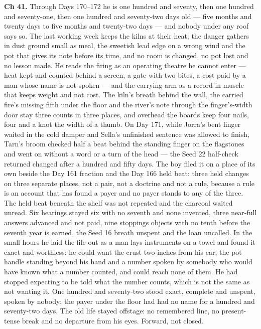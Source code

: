 \documentclass{design/chronicle}
\begin{document}
{\textbf{Ch 41.} Through Days 170–172 he is one hundred and seventy, then one hundred and seventy-one, then one hundred and seventy-two days old — five months and twenty days to five months and twenty-two days — and nobody under any roof says so. The last working week keeps the kilns at their heat; the danger gathers in dust ground small as meal, the sweetish lead edge on a wrong wind and the pot that gives its note before its time, and no room is changed, no pot lost and no lesson made. He reads the firing as an operating theatre he cannot enter — heat kept and counted behind a screen, a gate with two bites, a cost paid by a man whose name is not spoken — and the carrying arm as a record in muscle that keeps weight and not cost. The kiln’s breath behind the wall, the carried fire’s missing fifth under the floor and the river’s note through the finger’s-width door stay three counts in three places, and overhead the boards keep four nails, four and a knot the width of a thumb. On Day 171, while Jorra’s bent finger waited in the cold damper and Sella’s unfinished sentence was allowed to finish, Tarn’s broom checked half a beat behind the standing finger on the flagstones and went on without a word or a turn of the head — the Seed 22 half-check returned changed after a hundred and fifty days. The boy filed it on a place of its own beside the Day 161 fraction and the Day 166 held beat: three held changes on three separate places, not a pair, not a doctrine and not a rule, because a rule is an account that has found a payer and no payer stands to any of the three. The held beat beneath the shelf was not repeated and the charcoal waited unread. Six hearings stayed six with no seventh and none invented, three near-full answers advanced and not paid, nine stoppings objects with no tenth before the seventh year is earned, the Seed 16 breath unspent and the loan uncalled. In the small hours he laid the file out as a man lays instruments on a towel and found it exact and worthless: he could want the crust two inches from his ear, the pot handle standing beyond his hand and a number spoken by somebody who would have known what a number counted, and could reach none of them. He had stopped expecting to be told what the number counts, which is not the same as not wanting it. One hundred and seventy-two stood exact, complete and unspent, spoken by nobody; the payer under the floor had had no name for a hundred and seventy-two days. The old life stayed offstage: no remembered line, no present-tense break and no departure from his eyes. Forward, not closed.

}
\end{document}

